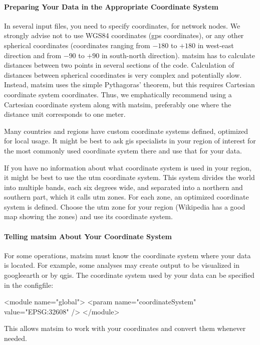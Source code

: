 \paragraph{Preparing Your Data in the Appropriate Coordinate System}
In several input files, you need to specify coordinates, \eg for network nodes. We strongly advise not to use WGS84 coordinates (\ie \gls{gps} coordinates), or any other spherical coordinates (coordinates ranging from $-180$ to $+180$ in west-east direction and from $-90$ to $+90$ in south-north direction). \gls{matsim} has to calculate distances between two points in several sections of the code. Calculation of distances between spherical coordinates is very complex and potentially slow. Instead, \gls{matsim} uses the simple Pythagoras' theorem, but this requires Cartesian coordinate system coordinates. Thus, we emphatically recommend using a Cartesian coordinate system along with \gls{matsim}, preferably one where the distance unit corresponds to one meter.

Many countries and regions have custom coordinate systems defined, optimized for local usage. It might be best to ask  \gls{gis} specialists in your region of interest for the most commonly used coordinate system there and use that for your data.

If you have no information
about what
coordinate system is used in your region, it might be best to use the \gls{utm} coordinate system. This  system divides the world into multiple bands, each six degrees wide, and separated into a northern and southern part, which it calls \gls{utm} zones. For each zone, an optimized coordinate system is defined. Choose the \gls{utm} zone for your region (Wikipedia has a good map showing the zones) and use its coordinate system. 

\paragraph{Telling \protect\gls{matsim} About Your Coordinate System}
For some operations, \gls{matsim} must know the coordinate system where your data is located. For example, some analyses may create output to be visualized in \gls{googleearth} or by \gls{qgis}.
The coordinate system used by your data can be specified in the \gls{configfile}:
\begin{xml}
<module name="global"> 
  <param name="coordinateSystem" value="EPSG:32608" /> 
</module>
\end{xml}
This allows \gls{matsim} to work with your coordinates and convert them whenever needed. 

